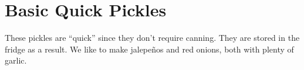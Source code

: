 \section[Quick Pickles]{Basic Quick Pickles}\label{quick_pickles}\label{basic_quick_pickles}

\begin{recipestats}[
        servings=16 \fluidounce,
        preptime=30 \minute,
        bakingtime=10 \minute,
        source=Teresi Family,
    ]
\end{recipestats}

\begin{recipeabstract}
    These pickles are ``quick'' since they don't require canning.
    They are stored in the fridge as a result.
    We like to make jalepe\~{n}os and red onions, both with plenty of garlic.
\end{recipeabstract}

\begin{ingredientcolumns}
    \begin{ingredientblock}
        \\
        \\
        \\
        \\
        \\
        \\
    \end{ingredientblock}

    \bigskip
    \begin{ingredientblock}
        \\
        \\
        \\
        \\
        \\
        \\
    \end{ingredientblock}
\end{ingredientcolumns}

